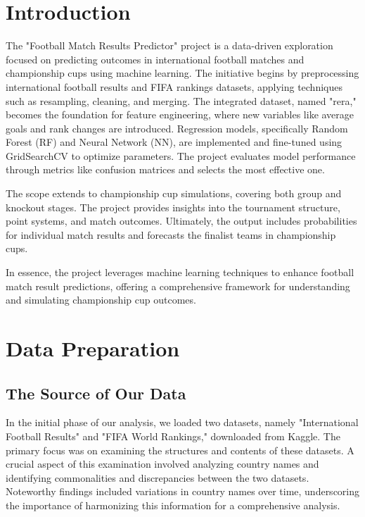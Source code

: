 \documentclass[letterpaper]{article}
\begin{document}
	\newpage %
	
	\section*{Introduction}
	The "Football Match Results Predictor" project is a data-driven exploration focused on predicting outcomes in international football matches and championship cups using machine learning. The initiative begins by preprocessing international football results and FIFA rankings datasets, applying techniques such as resampling, cleaning, and merging. The integrated dataset, named "rera," becomes the foundation for feature engineering, where new variables like average goals and rank changes are introduced. Regression models, specifically Random Forest (RF) and Neural Network (NN), are implemented and fine-tuned using GridSearchCV to optimize parameters. The project evaluates model performance through metrics like confusion matrices and selects the most effective one.
	
	The scope extends to championship cup simulations, covering both group and knockout stages. The project provides insights into the tournament structure, point systems, and match outcomes. Ultimately, the output includes probabilities for individual match results and forecasts the finalist teams in championship cups.
	
	In essence, the project leverages machine learning techniques to enhance football match result predictions, offering a comprehensive framework for understanding and simulating championship cup outcomes.
	
	\newpage %
	
	\section*{Data Preparation}
	\subsection*{The Source of Our Data}
	In the initial phase of our analysis, we loaded two datasets, namely "International Football Results" and "FIFA World Rankings," downloaded from Kaggle. The primary focus was on examining the structures and contents of these datasets. A crucial aspect of this examination involved analyzing country names and identifying commonalities and discrepancies between the two datasets. Noteworthy findings included variations in country names over time, underscoring the importance of harmonizing this information for a comprehensive analysis.
	
\end{document}
